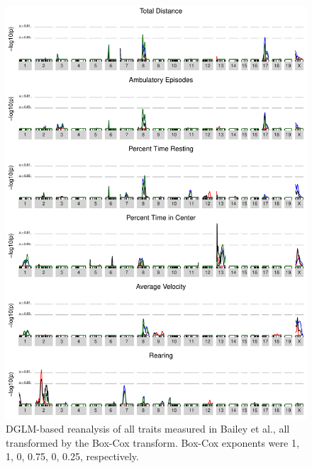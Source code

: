         \begin{figure}[h]
            \includegraphics[height=0.9\textheight]{images/bailey_scans_bc.pdf}
            \caption{DGLM-based reanalysis of all traits measured in Bailey et al., all transformed by the Box-Cox transform.  Box-Cox exponents were 1, 1, 0, 0.75, 0, 0.25, respectively.}
            \label{fig:Bailey_bc_scans}
        \end{figure}

